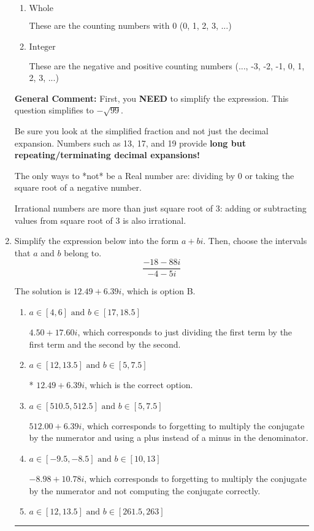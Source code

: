 \documentclass{extbook}[14pt]
\newcommand{\litem}[1]{\item #1

\rule{\textwidth}{0.4pt}}
\begin{document}
\begin{enumerate}
{\begin{enumerate}[label=\Alph*.]
* This is the correct option!
\item \( \text{Whole} \)

These are the counting numbers with 0 (0, 1, 2, 3, ...)
\item \( \text{Integer} \)

These are the negative and positive counting numbers (..., -3, -2, -1, 0, 1, 2, 3, ...)
\end{enumerate}

\textbf{General Comment:} First, you \textbf{NEED} to simplify the expression. This question simplifies to $-\sqrt{99}$. 
 
 Be sure you look at the simplified fraction and not just the decimal expansion. Numbers such as 13, 17, and 19 provide \textbf{long but repeating/terminating decimal expansions!} 
 
 The only ways to *not* be a Real number are: dividing by 0 or taking the square root of a negative number. 
 
 Irrational numbers are more than just square root of 3: adding or subtracting values from square root of 3 is also irrational.
}
\litem{
Simplify the expression below into the form $a+bi$. Then, choose the intervals that $a$ and $b$ belong to.
\[ \frac{-18 - 88 i}{-4 - 5 i} \]

The solution is \( 12.49  + 6.39 i \), which is option B.\begin{enumerate}[label=\Alph*.]
\item \( a \in [4, 6] \text{ and } b \in [17, 18.5] \)

 $4.50  + 17.60 i$, which corresponds to just dividing the first term by the first term and the second by the second.
\item \( a \in [12, 13.5] \text{ and } b \in [5, 7.5] \)

* $12.49  + 6.39 i$, which is the correct option.
\item \( a \in [510.5, 512.5] \text{ and } b \in [5, 7.5] \)

 $512.00  + 6.39 i$, which corresponds to forgetting to multiply the conjugate by the numerator and using a plus instead of a minus in the denominator.
\item \( a \in [-9.5, -8.5] \text{ and } b \in [10, 13] \)

 $-8.98  + 10.78 i$, which corresponds to forgetting to multiply the conjugate by the numerator and not computing the conjugate correctly.
\item \( a \in [12, 13.5] \text{ and } b \in [261.5, 263] \)


\end{enumerate}}
\end{enumerate}
\end{document}
